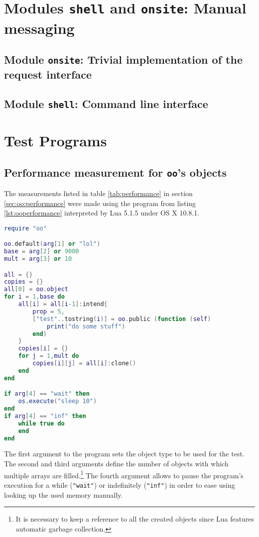 \begin{appendices}

\chapter{Modules \texttt{shell} and \texttt{onsite}: Manual messaging}
\label{shell}

\section{Module \texttt{onsite}: Trivial implementation of the request interface}

\section{Module \texttt{shell}: Command line interface}

\chapter{Test Programs}

\section{Performance measurement for \texttt{oo}'s objects}
\label{sec:app:ooperformance}

The measurements listed in table \ref{tab:performance} in section \ref{sec:oo:performance} were made using the program from listing \ref{lst:ooperformance} interpreted by Lua 5.1.5 under OS X 10.8.1. 

\begin{lstlisting}[language=lua, caption={Test program for memory measurement of different object types}, label=lst:ooperformance, name=lst:ooperformance]
require "oo"

oo.default(arg[1] or "lol")
base = arg[2] or 9000
mult = arg[3] or 10

all = {}
copies = {}
all[0] = oo.object
for i = 1,base do
	all[i] = all[i-1]:intend{
		prop = 5,
		["test"..tostring(i)] = oo.public (function (self)
			print("do some stuff")
		end)
	}
	copies[i] = {}
	for j = 1,mult do
		copies[i][j] = all[i]:clone()
	end
end

if arg[4] == "wait" then
	os.execute("sleep 10")
end
if arg[4] == "inf" then
	while true do
	end
end
\end{lstlisting}
	
The first argument to the program sets the object type to be used for the test. The second and third arguments define the number of objects with which multiple arrays are filled.\footnote{It is necessary to keep a reference to all the created objects since Lua features automatic garbage collection.} The fourth argument allows to pause the program's execution for a while (\texttt{"wait"}) or indefinitely (\texttt{"inf"}) in order to ease using looking up the used memory manually.


\end{appendices}
